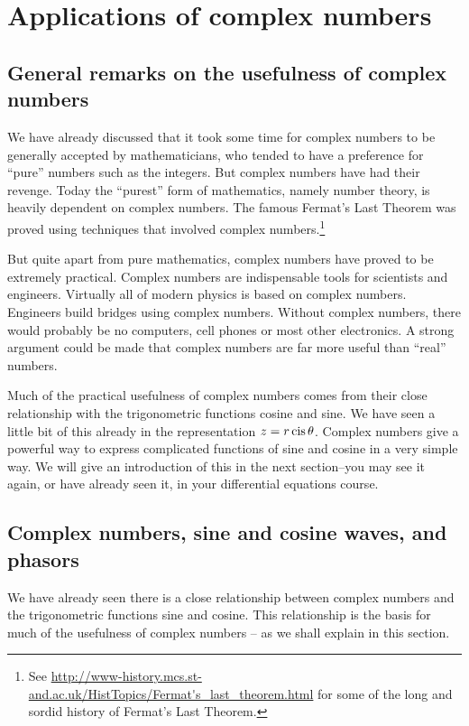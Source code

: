 \section{Applications of complex numbers}

\subsection{General remarks on the usefulness of complex numbers}

We have already discussed that it took some time for complex numbers to be generally accepted by mathematicians, who tended to have a preference for ``pure'' numbers such as the integers. But complex numbers have had their revenge. Today the ``purest'' form of mathematics, namely number theory, is heavily dependent on complex numbers. The famous Fermat's Last Theorem was proved using techniques that involved complex numbers.\footnote{See \url{http://www-history.mcs.st-and.ac.uk/HistTopics/Fermat's_last_theorem.html} for some of the long and sordid history of Fermat's Last Theorem.}

But quite apart from pure mathematics, complex numbers have proved to be extremely practical. Complex numbers are indispensable tools for
scientists and engineers. Virtually all of modern physics is based
on complex numbers. Engineers build bridges using complex numbers.
Without complex numbers, there would probably be no computers, cell
phones or most other electronics. A strong argument could be made that complex numbers are far more useful than ``real'' numbers.

Much of the practical usefulness of complex numbers comes from their close relationship
with the trigonometric functions cosine and sine. We have seen a little
bit of this already in the representation $z=r\operatorname{cis}\theta$.
Complex numbers give a powerful way to express complicated functions
of sine and cosine in a very simple way. We will give an introduction of this in the next section--you may see it again, or have already seen it, in your differential equations course.


\subsection{Complex numbers, sine and cosine waves, and phasors}

We have already seen there is a close relationship between complex numbers and the trigonometric functions sine and cosine. This relationship is the basis for much of the usefulness of complex numbers -- as we shall explain in this section.

